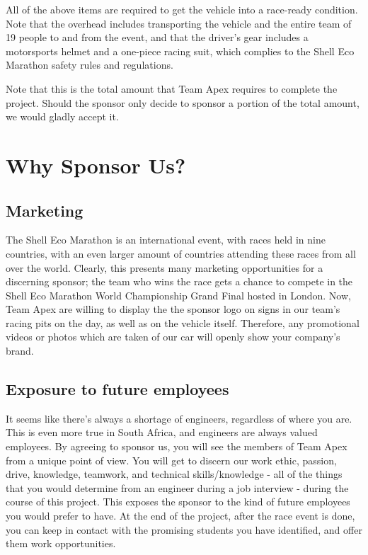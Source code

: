 \documentclass[a4paper, 12pt]{article}
\newcommand{\company}{the sponsor}
\begin{document}
		All of the above items are required to get the vehicle into a race-ready condition. Note that the overhead includes transporting the vehicle and the entire team of 19 people to and from the event, and that the driver's gear includes a motorsports helmet and a one-piece racing suit, which complies to the Shell Eco Marathon safety rules and regulations.\vspace*{1em}\par\noindent
		Note that this is the total amount that Team Apex requires to complete the project. Should \company{} only decide to sponsor a portion of the total amount, we would gladly accept it.

	\section{Why Sponsor Us?} %
	\label{sec:benefits_to_the_client}
		\subsection{Marketing} %
		\label{sub:marketing}
			The Shell Eco Marathon is an international event, with races held in nine countries, with an even larger amount of countries attending these races from all over the world. Clearly, this presents many marketing opportunities for a discerning sponsor; the team who wins the race gets a chance to compete in the Shell Eco Marathon World Championship Grand Final hosted in London. Now, Team Apex are willing to display the \company{} logo on signs in our team's racing pits on the day, as well as on the vehicle itself. Therefore, any promotional videos or photos which are taken of our car will openly show your company's brand.
		
		\subsection{Exposure to future employees} %
		\label{sub:exposure_to_future_employees}
			It seems like there's always a shortage of engineers, regardless of where you are. This is even more true in South Africa, and engineers are always valued employees. By agreeing to sponsor us, you will see the members of Team Apex from a unique point of view. You will get to discern our work ethic, passion, drive, knowledge, teamwork, and technical skills/knowledge - all of the things that you would determine from an engineer during a job interview - during the course of this project. This exposes \company{} to the kind of future employees you would prefer to have. At the end of the project, after the race event is done, you can keep in contact with the promising students you have identified, and offer them work opportunities.
\end{document}
